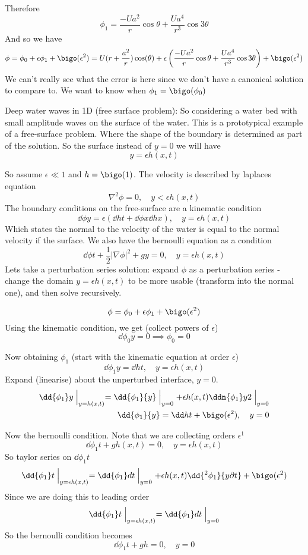 \documentclass{/home/janmebows/Documents/LatexTemplates/myassignment}
\begin{document}
Therefore
\[\phi_1 = \frac{-Ua^2}{r} \cos\theta + \frac{Ua^4}{r^3} \cos3\theta\]
And so we have
\[\phi = \phi_0 + \epsilon\phi_1 + \bigo(\epsilon^2)=  U(r + \frac{a^2}{r})\cos(\theta) + \epsilon\left(\frac{-Ua^2}{r} \cos\theta + \frac{Ua^4}{r^3} \cos3\theta\right)+ \bigo(\epsilon^2)\]
We can't really see what the error is here since we don't have a canonical solution to compare to. 
We want to know when $\phi_1 = \bigo(\phi_0)$



Deep water waves in 1D (free surface problem):
So considering a water bed with small amplitude waves on the surface of the water. This is a prototypical example of a free-surface problem. Where the shape of the boundary is determined as part of the solution. 
So the surface instead of $y=0$ we will have
\[y = \epsilon h(x,t)\]

So assume $\epsilon \ll 1$ and $h = \bigo(1)$. The velocity is described by laplaces equation
\[\nabla^2 \phi = 0, \quad y < \epsilon h(x,t)\]
The boundary conditions on the free-surface are a kinematic condition
\[\dd\phi y = \epsilon\left(\dd ht + \dd\phi x \dd hx\right),\quad y=\epsilon h(x,t)\]
Which states the normal to the velocity of the water is equal to the normal velocity if the surface. We also have the bernoulli equation as a condition
\[\dd\phi t + \frac12 |\nabla \phi|^2 + gy = 0,\quad y=\epsilon h(x,t)\]
Lets take a perturbation series solution: expand $\phi$ as a perturbation series - change the domain $y = \epsilon h(x,t)$ to be more usable (transform into the normal one), and then solve recursively.

\[\phi = \phi_0 + \epsilon \phi_1 + \bigo(\epsilon^2)\]
Using the kinematic condition, we get (collect powers of $\epsilon$)
\[\dd{\phi_0}{y} = 0 \implies \phi_0 = 0\]

Now obtaining $\phi_1$ (start with the kinematic equation at order $\epsilon$)
\[\dd{\phi_1}{y} = \dd ht, \quad y = \epsilon h(x,t)\]
Expand (linearise) about the unperturbed interface, $y=0$.
\begin{align*}
    \dd{\phi_1}y \Bigm|_{y=h(x,t)} = \dd{\phi_1}{y}\Bigm|_{y=0} + \epsilon h(x,t) \ddn{\phi_1}y2\Bigm|_{y=0}\\
    \dd{\phi_1}{y} = \dd ht + \bigo(\epsilon^2),\quad y=0
\end{align*}

Now the bernoulli condition. Note that we are collecting orders $\epsilon^1$
\[\dd{\phi_1}t + gh(x,t) =0,\quad y = \epsilon h(x,t) \]
So taylor series on $\dd{\phi_1}t$
\[\dd{\phi_1}t\Bigm|_{y=\epsilon h(x,t)} = \dd{\phi_1}dt\Bigm|_{y=0} + \epsilon h(x,t) \dd{^2\phi_1}{y\partial t} + \bigo(\epsilon^2)\]
Since we are doing this to leading order
\[\dd{\phi_1}t\Bigm|_{y=\epsilon h(x,t)} = \dd{\phi_1}dt\Bigm|_{y=0}\]
So the bernoulli condition becomes
\[\dd{\phi_1}{t} + gh = 0 ,\quad y=0\]
\end{document}
